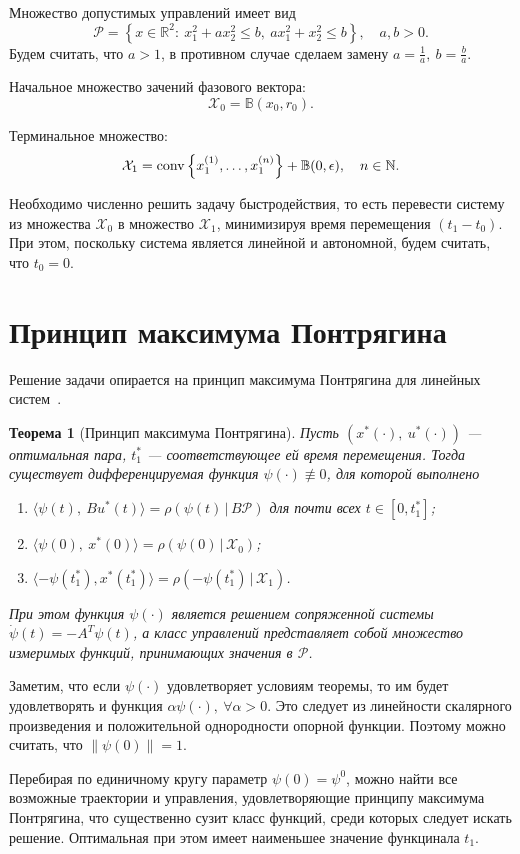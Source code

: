 \documentclass[11pt]{article}
\newtheorem{Th}{Теорема}
\newcommand\Real{\mathbb{R}}
\newcommand\PS{\mathcal{P}}
\newcommand\X{\mathcal{X}}
\newcommand\Sup[2]{\rho( #1 \, | \, #2 )}
\newcommand\Conv[1]{{\rm conv}\left\{ #1 \right\}}
\begin{document}
Множество допустимых управлений имеет вид 
$$ \PS = \left\{ x \in \Real^2 \colon \ x_1^2 + a x_2^2 \leq b, \ ax_1^2 + x_2^2 \leq b \right\}, \quad a,b > 0.$$
Будем считать, что $a > 1$, в противном случае сделаем замену $a = \frac{1}{a}, \ b = \frac{b}{a}$.

Начальное множество зачений фазового вектора: $$\X_0 = \mathbb{B}(x_0, r_0).$$

Терминальное множество: $$\X_1 = \Conv{x_1^{\left(1\right)}, \ldots, x_1^{\left(n\right)}} + \mathbb{B}(0, \epsilon), \quad n \in \mathbb{N}.$$

Необходимо численно решить задачу быстродействия, то есть перевести систему из множества $\X_0$ в множество $\X_1$,
минимизируя время перемещения $(t_1 - t_0)$. При этом, поскольку система является линейной и автономной, будем считать, что $t_0 = 0$.


\section{Принцип максимума Понтрягина}
Решение задачи опирается на принцип максимума Понтрягина для линейных систем~\cite{rublev}.
\begin{Th}[Принцип максимума Понтрягина] \label{PMP}
Пусть $(x^*(\cdot), \ u^*(\cdot))$ --- оптимальная пара, $t_1^*$ --- соответствующее ей время перемещения. Тогда существует дифференцируемая функция 
$\psi(\cdot) \not\equiv 0$, для которой выполнено
\begin{enumerate}
\item $\langle \psi(t), \ Bu^*(t) \rangle = \Sup{\psi(t)}{B \PS}$ для почти всех $t \in [0, t_1^*]$; 
\item $\langle \psi(0), \ x^*(0) \rangle = \Sup{\psi(0)}{\X_0}$;
\item $\langle -\psi(t_1^*), x^*(t_1^*) \rangle = \Sup{-\psi(t_1^*)}{\X_1}$.
\end{enumerate}
При этом функция $\psi(\cdot)$ является решением сопряженной системы $\dot \psi(t) = -A^T\psi(t)$, а
класс управлений представляет собой множество измеримых функций, принимающих значения в $\PS$.
\end{Th}
 
Заметим, что если $\psi(\cdot)$ удовлетворяет условиям теоремы, то им будет удовлетворять и функция 
$\alpha \psi(\cdot), \ \forall \alpha > 0$. Это следует из линейности скалярного произведения и 
положительной однородности опорной функции. Поэтому можно считать, что $\|\psi(0)\| = 1$.

Перебирая по единичному кругу параметр $\psi(0) = \psi^0$, можно найти все возможные траектории 
и управления, удовлетворяющие принципу максимума Понтрягина, что существенно
сузит класс функций, среди которых следует искать решение. Оптимальная при этом 
имеет наименьшее значение функцинала $t_1$.
\end{document}

